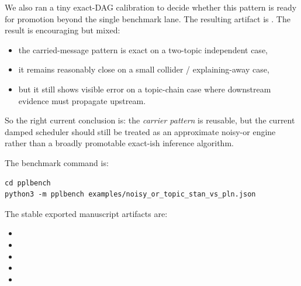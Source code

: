 \documentclass[11pt,openany]{report}
\begin{document}
We also ran a tiny exact-DAG calibration to decide whether this pattern is
ready for promotion beyond the single benchmark lane.  The resulting artifact
is .  The result
is encouraging but mixed:
\begin{itemize}
\item the carried-message pattern is exact on a two-topic independent case,
\item it remains reasonably close on a small collider / explaining-away case,
\item but it still shows visible error on a topic-chain case where downstream
  evidence must propagate upstream.
\end{itemize}
So the right current conclusion is: the \emph{carrier pattern} is reusable, but
the current damped scheduler should still be treated as an approximate noisy-or
engine rather than a broadly promotable exact-ish inference algorithm.

The benchmark command is:
\begin{lstlisting}
cd pplbench
python3 -m pplbench examples/noisy_or_topic_stan_vs_pln.json
\end{lstlisting}

The stable exported manuscript artifacts are:
\begin{itemize}
\item {}
\item {}
\item {}
\item {}
\item {}
\end{itemize}

\begin{table}[htbp]
\centering
\caption{Noisy-or upgrade story on the same small PPLBench family.  The
legacy heuristic PLN lane was extremely fast but statistically weak.  The
semantic factor-graph WM-PLN lane is slower, but it closes the predictive-fit
gap dramatically and slightly exceeds Stan on final PLL in this recorded run.}
\label{tab:pplbench-noisy-or-upgrade}
\end{table}
\end{document}

